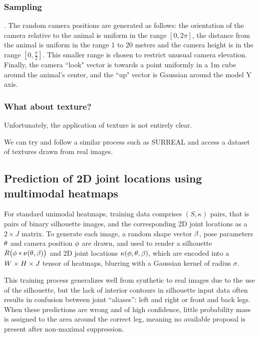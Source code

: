 \subsubsection{Sampling}. The random camera positions are generated as follows: the orientation of the camera relative to the animal is uniform in the range $[0, 2\pi]$, the distance from the animal is uniform in the range 1 to 20 meters and the camera height is in the range $[0,\frac{\pi}{2}]$. This smaller range is chosen to restrict unusual camera elevation. Finally, the camera ``look" vector is towards a point uniformly in a 1m cube around the animal's center, and the ``up" vector is Gaussian around the model Y axis.  

\subsubsection{What about texture?} Unfortunately, the application of texture is not entirely clear. 

We can try and follow a similar process such as SURREAL and access a dataset of textures drawn from real images. %


\subsection{Prediction of 2D joint locations using multimodal heatmaps}


For standard unimodal heatmaps, training data comprises $(S, \kappa)$ pairs, that is pairs of binary silhouette images, and the corresponding 2D joint locations as a $2\times J$ matrix.  To generate each image, a random shape vector $\beta$, pose parameters $\theta$ and camera position $\phi$ are drawn, and used to render a silhouette $R\bigl(\phi * \nu(\theta, \beta)\bigr)$ and 2D joint locations $\kappa(\phi,\theta,\beta)$, which are encoded into a $W \times H \times J$ tensor of heatmaps, blurring with a Gaussian kernel of radius $\sigma$. 


This training process generalizes well from synthetic to real images due to the use of the silhouette, but the lack of interior contours in silhouette input data often results in confusion between joint ``aliases'': left and right or front and back legs.  When these predictions are wrong and of high confidence, little probability mass is assigned to the area around the correct leg, meaning no available proposal is present after non-maximal suppression.

